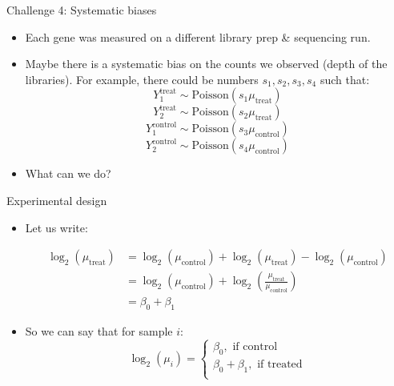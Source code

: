 \documentclass[red,xcolor={table,usenames,dvipsnames}]{beamer}
\begin{document}
\begin{frame}{Challenge 4: Systematic biases}
\begin{itemize}
  \item Each gene was measured on a different library prep \& sequencing run. 
  \item Maybe there is a systematic bias on the counts we observed (depth of the libraries). For example, there could be numbers $s_1,s_2,s_3,s_4$ such that:
 $$ Y^{\text{treat}}_{1} \sim \text{Poisson}(s_1 \mu_{\text{treat}})$$
 $$ Y^{\text{treat}}_{2} \sim \text{Poisson}(s_2 \mu_{\text{treat}})$$
 $$ Y^{\text{control}}_{1}  \sim \text{Poisson}(s_3 \mu_{\text{control}})$$
 $$ Y^{\text{control}}_{2}  \sim \text{Poisson}(s_4 \mu_{\text{control}})$$
 \item What can we do?
\end{itemize}
\end{frame}

\begin{frame}{Experimental design}

\begin{itemize}
  \item Let us write:

   $$
   \begin{aligned}
   \log_2(\mu_{\text{treat}}) &= \log_2(\mu_{\text{control}}) +\log_2(\mu_{\text{treat}}) -\log_2(\mu_{\text{control}}) \\
   &=\log_2(\mu_{\text{control}}) + \log_2\left(\frac{\mu_{\text{treat}}}{\mu_{\text{control}}} \right) \\
    &= \beta_0 + \beta_1
   \end{aligned}
   $$

   \item So we can say that for sample $i$:
$$
\log_2(\mu_i)=
\begin{cases}
\beta_0, \text{ if control}\\
\beta_0 + \beta_1,\text{ if treated}\\
\end{cases}
$$
\end{itemize}

\end{frame}
\end{document}
